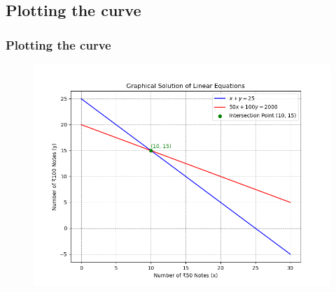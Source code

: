 \documentclass{beamer}
\theoremstyle{remark}
\numberwithin{equation}{section}
\begin{document}
	\subsection{Plotting the curve}
	\begin{frame}
		\frametitle{Plotting the curve}
		\begin{figure}[h]
			\includegraphics[scale=0.5]{fig.png}
			\centering
		\end{figure}
	\end{frame}
\end{document}

